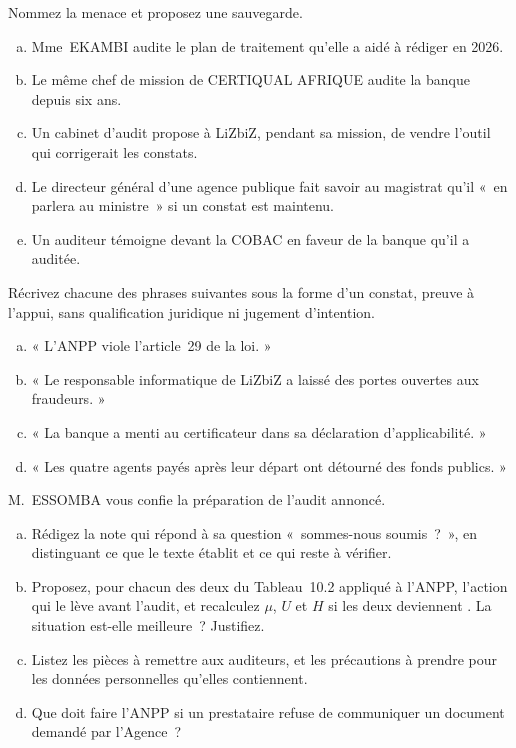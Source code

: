 \begin{boxexo}[title={\ding{45}\quad Exercice~10.2. Menaces sur l'indépendance \niveaumoyen}]
Nommez la menace et proposez une sauvegarde.
\begin{enumerate}[(a)]
    \item Mme~EKAMBI audite le plan de traitement qu'elle a aidé à rédiger
          en 2026.
    \item Le même chef de mission de CERTIQUAL AFRIQUE audite la banque
          depuis six ans.
    \item Un cabinet d'audit propose à LiZbiZ, pendant sa mission, de
          vendre l'outil qui corrigerait les constats.
    \item Le directeur général d'une agence publique fait savoir au
          magistrat qu'il «~en parlera au ministre~» si un constat est
          maintenu.
    \item Un auditeur témoigne devant la COBAC en faveur de la banque qu'il
          a auditée.
\end{enumerate}
\end{boxexo}

\begin{boxexo}[title={\ding{45}\quad Exercice~10.3. Constater, pas qualifier \niveaumoyen}]
Récrivez chacune des phrases suivantes sous la forme d'un constat,
preuve à l'appui, sans qualification juridique ni jugement d'intention.
\begin{enumerate}[(a)]
    \item « L'ANPP viole l'article~29 de la loi. »
    \item « Le responsable informatique de LiZbiZ a laissé des portes
          ouvertes aux fraudeurs. »
    \item « La banque a menti au certificateur dans sa déclaration
          d'applicabilité. »
    \item « Les quatre agents payés après leur départ ont détourné des
          fonds publics. »
\end{enumerate}
\end{boxexo}

\begin{boxexo}[title={\ding{45}\quad Exercice~10.4. Préparer l'audit de l'ANTIC \niveauexpert}]
M.~ESSOMBA vous confie la préparation de l'audit annoncé.
\begin{enumerate}[(a)]
    \item Rédigez la note qui répond à sa question «~sommes-nous soumis~?~»,
          en distinguant ce que le texte établit et ce qui reste à vérifier.
    \item Proposez, pour chacun des deux \NEK{} du Tableau~10.2 appliqué à
          l'ANPP, l'action qui le lève avant l'audit, et recalculez $\mu$,
          $U$ et $H$ si les deux deviennent \NON{}. La situation est-elle
          meilleure~? Justifiez.
    \item Listez les pièces à remettre aux auditeurs, et les précautions à
          prendre pour les données personnelles qu'elles contiennent.
    \item Que doit faire l'ANPP si un prestataire refuse de communiquer un
          document demandé par l'Agence~?
\end{enumerate}
\end{boxexo}

